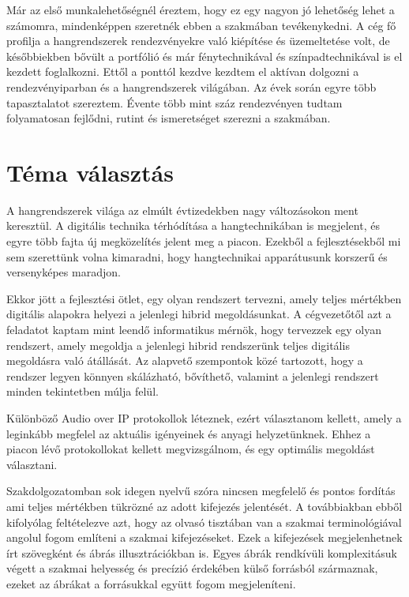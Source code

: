 Már az első munkalehetőségnél éreztem, hogy ez egy nagyon jó lehetőség lehet a számomra, mindenképpen szeretnék ebben a szakmában tevékenykedni.
A cég fő profilja a hangrendszerek rendezvényekre való kiépítése és üzemeltetése volt, de későbbiekben bővült a portfólió és már fénytechnikával és színpadtechnikával is el kezdett foglalkozni. 
Ettől a ponttól kezdve kezdtem el aktívan dolgozni a rendezvényiparban és a hangrendszerek világában. Az évek során egyre több tapasztalatot szereztem.
Évente több mint száz rendezvényen tudtam folyamatosan fejlődni, rutint és ismeretséget szerezni a szakmában.
\section{Téma választás}
A hangrendszerek világa az elmúlt évtizedekben nagy változásokon ment keresztül.
A digitális technika térhódítása a hangtechnikában is megjelent, és egyre több fajta új megközelítés jelent meg a piacon.
Ezekből a fejlesztésekből mi sem szerettünk volna kimaradni, hogy hangtechnikai apparátusunk korszerű és versenyképes maradjon.

Ekkor jött a fejlesztési ötlet, egy olyan rendszert tervezni, amely teljes mértékben digitális alapokra helyezi a jelenlegi hibrid megoldásunkat.
A cégvezetőtől azt a feladatot kaptam mint leendő informatikus mérnök, hogy tervezzek egy olyan rendszert,
amely megoldja a jelenlegi hibrid rendszerünk teljes digitális megoldásra való átállását.
Az alapvető szempontok közé tartozott, hogy a rendszer legyen könnyen skálázható, bővíthető, valamint a jelenlegi rendszert minden tekintetben múlja felül.

Különböző Audio over IP protokollok léteznek, ezért választanom kellett, amely a leginkább megfelel az aktuális igényeinek és anyagi helyzetünknek.
Ehhez a piacon lévő protokollokat kellett megvizsgálnom, és egy optimális megoldást választani.

Szakdolgozatomban sok idegen nyelvű szóra nincsen megfelelő és pontos fordítás ami teljes mértékben tükrözné az adott kifejezés jelentését.
A továbbiakban ebből kifolyólag feltételezve azt, hogy az olvasó tisztában van a szakmai terminológiával angolul fogom említeni a szakmai kifejezéseket.
Ezek a kifejezések megjelenhetnek írt szövegként és ábrás illusztrációkban is. Egyes ábrák rendkívüli komplexitásuk végett a szakmai helyesség és precízió érdekében
külső forrásból származnak, ezeket az ábrákat a forrásukkal együtt fogom megjeleníteni.
